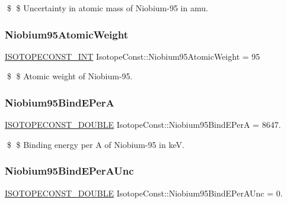 \$ \$ Uncertainty in atomic mass of Niobium-\/95 in amu. \mbox{\label{group___isotope_const-_niobium-_nb95_gabce7549abc9a267b4fb9d49ec6405f89}} 
\subsubsection{\texorpdfstring{Niobium95\+Atomic\+Weight}{Niobium95AtomicWeight}}
{\footnotesize\ttfamily \mbox{\hyperlink{group___isotope_const-_macros_ga5f18360b3e99483a35c32d789e62621c}{I\+S\+O\+T\+O\+P\+E\+C\+O\+N\+S\+T\+\_\+\+I\+NT}} Isotope\+Const\+::\+Niobium95\+Atomic\+Weight = 95}

\$ \$ Atomic weight of Niobium-\/95. \mbox{\label{group___isotope_const-_niobium-_nb95_gae4fb55e2b18cf474f8dd635f1a4fa23f}} 
\subsubsection{\texorpdfstring{Niobium95\+Bind\+E\+PerA}{Niobium95BindEPerA}}
{\footnotesize\ttfamily \mbox{\hyperlink{group___isotope_const-_macros_ga8f45a7272ce02c0b4c65c44636ed719a}{I\+S\+O\+T\+O\+P\+E\+C\+O\+N\+S\+T\+\_\+\+D\+O\+U\+B\+LE}} Isotope\+Const\+::\+Niobium95\+Bind\+E\+PerA = 8647.}

\$ \$ Binding energy per A of Niobium-\/95 in keV. \mbox{\label{group___isotope_const-_niobium-_nb95_gac23819d9278b4909d22b474b4383a7cb}} 
\subsubsection{\texorpdfstring{Niobium95\+Bind\+E\+Per\+A\+Unc}{Niobium95BindEPerAUnc}}
{\footnotesize\ttfamily \mbox{\hyperlink{group___isotope_const-_macros_ga8f45a7272ce02c0b4c65c44636ed719a}{I\+S\+O\+T\+O\+P\+E\+C\+O\+N\+S\+T\+\_\+\+D\+O\+U\+B\+LE}} Isotope\+Const\+::\+Niobium95\+Bind\+E\+Per\+A\+Unc = 0.}

